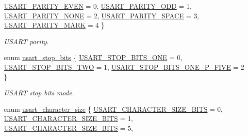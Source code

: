 \begin{DoxyCompactItemize}
\hyperlink{group___h_p_l_gga867cc5f0ea7d3bf651d68f0046cf6f41ae5d22c99a30184aff19d77c1a970fb23}{U\+S\+A\+R\+T\+\_\+\+P\+A\+R\+I\+T\+Y\+\_\+\+E\+V\+EN} = 0, 
\hyperlink{group___h_p_l_gga867cc5f0ea7d3bf651d68f0046cf6f41a69c6cdd4d354d3b26c8d2f09f49d2ede}{U\+S\+A\+R\+T\+\_\+\+P\+A\+R\+I\+T\+Y\+\_\+\+O\+DD} = 1, 
\hyperlink{group___h_p_l_gga867cc5f0ea7d3bf651d68f0046cf6f41aecf52ec650226bdc63e12a21d3b5585d}{U\+S\+A\+R\+T\+\_\+\+P\+A\+R\+I\+T\+Y\+\_\+\+N\+O\+NE} = 2, 
\hyperlink{group___h_p_l_gga867cc5f0ea7d3bf651d68f0046cf6f41a67f8ec9a06b6c88969caae8b186a680a}{U\+S\+A\+R\+T\+\_\+\+P\+A\+R\+I\+T\+Y\+\_\+\+S\+P\+A\+CE} = 3, 
\newline
\hyperlink{group___h_p_l_gga867cc5f0ea7d3bf651d68f0046cf6f41adaac8e86191a3f82a0da0610bacff70d}{U\+S\+A\+R\+T\+\_\+\+P\+A\+R\+I\+T\+Y\+\_\+\+M\+A\+RK} = 4
 \}\begin{DoxyCompactList}\small\item\em U\+S\+A\+RT parity. \end{DoxyCompactList}
\item 
enum \hyperlink{group___h_p_l_ga88311517c5168c29a681604a8a33b06e}{usart\+\_\+stop\+\_\+bits} \{ \hyperlink{group___h_p_l_gga88311517c5168c29a681604a8a33b06ea6353d11d2e690bbaed6572dd1e2d6515}{U\+S\+A\+R\+T\+\_\+\+S\+T\+O\+P\+\_\+\+B\+I\+T\+S\+\_\+\+O\+NE} = 0, 
\hyperlink{group___h_p_l_gga88311517c5168c29a681604a8a33b06ea1b705e4ff84a8839ffffdf2929772366}{U\+S\+A\+R\+T\+\_\+\+S\+T\+O\+P\+\_\+\+B\+I\+T\+S\+\_\+\+T\+WO} = 1, 
\hyperlink{group___h_p_l_gga88311517c5168c29a681604a8a33b06ea09d207bc4b627981d32fff8b0ed235f8}{U\+S\+A\+R\+T\+\_\+\+S\+T\+O\+P\+\_\+\+B\+I\+T\+S\+\_\+\+O\+N\+E\+\_\+\+P\+\_\+\+F\+I\+VE} = 2
 \}\begin{DoxyCompactList}\small\item\em U\+S\+A\+RT stop bits mode. \end{DoxyCompactList}
\item 
enum \hyperlink{group___h_p_l_ga631ce7b4f60dccd392e6d6ef7d3cd4e2}{usart\+\_\+character\+\_\+size} \{ \newline
\hyperlink{group___h_p_l_gga631ce7b4f60dccd392e6d6ef7d3cd4e2ad7d75e6dd09ada4e328e9d77ea5a882a}{U\+S\+A\+R\+T\+\_\+\+C\+H\+A\+R\+A\+C\+T\+E\+R\+\_\+\+S\+I\+Z\+E\+\_\+B\+I\+TS} = 0, 
\hyperlink{group___h_p_l_gga631ce7b4f60dccd392e6d6ef7d3cd4e2a8a0da561e5c3c43da6e334e5a7d9d363}{U\+S\+A\+R\+T\+\_\+\+C\+H\+A\+R\+A\+C\+T\+E\+R\+\_\+\+S\+I\+Z\+E\+\_\+B\+I\+TS} = 1, 
\hyperlink{group___h_p_l_gga631ce7b4f60dccd392e6d6ef7d3cd4e2a9d494ae2bc870cd5a4a3e832e3b0334d}{U\+S\+A\+R\+T\+\_\+\+C\+H\+A\+R\+A\+C\+T\+E\+R\+\_\+\+S\+I\+Z\+E\+\_\+B\+I\+TS} = 5, 

\end{DoxyCompactItemize}
